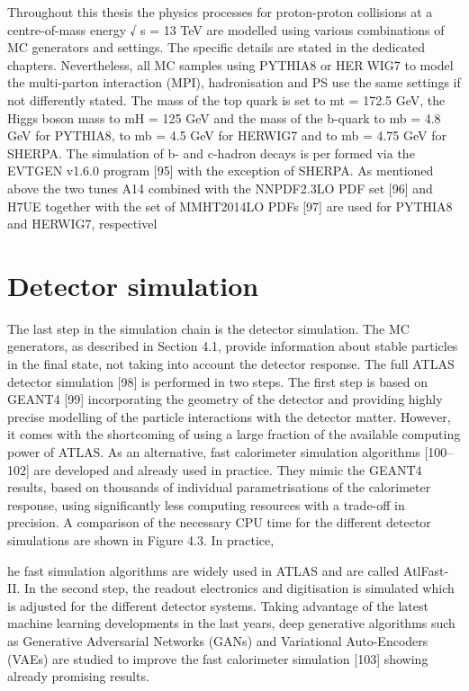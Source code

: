 Throughout this thesis the physics processes for proton-proton collisions at a centre-of-mass energy
√
s = 13 TeV are modelled using various combinations of MC generators and settings. The specific
details are stated in the dedicated chapters. Nevertheless, all MC samples using PYTHIA8 or HERWIG7 to model the multi-parton interaction (MPI), hadronisation and PS use the same settings if not
differently stated. The mass of the top quark is set to mt = 172.5 GeV, the Higgs boson mass to
mH = 125 GeV and the mass of the b-quark to mb = 4.8 GeV for PYTHIA8, to mb = 4.5 GeV for
HERWIG7 and to mb = 4.75 GeV for SHERPA. The simulation of b- and c-hadron decays is performed via the EVTGEN v1.6.0 program [95] with the exception of SHERPA. As mentioned above
the two tunes A14 combined with the NNPDF2.3LO PDF set [96] and H7UE together with the set
of MMHT2014LO PDFs [97] are used for PYTHIA8 and HERWIG7, respectivel


\section{Detector simulation}

The last step in the simulation chain is the detector simulation. The MC generators, as described
in Section 4.1, provide information about stable particles in the final state, not taking into account
the detector response. The full ATLAS detector simulation [98] is performed in two steps. The
first step is based on GEANT4 [99] incorporating the geometry of the detector and providing highly
precise modelling of the particle interactions with the detector matter. However, it comes with the
shortcoming of using a large fraction of the available computing power of ATLAS. As an alternative,
fast calorimeter simulation algorithms [100–102] are developed and already used in practice. They
mimic the GEANT4 results, based on thousands of individual parametrisations of the calorimeter
response, using significantly less computing resources with a trade-off in precision. A comparison
of the necessary CPU time for the different detector simulations are shown in Figure 4.3. In practice,

he fast simulation algorithms are widely used in ATLAS and are called AtlFast-II. In the second
step, the readout electronics and digitisation is simulated which is adjusted for the different detector
systems.
Taking advantage of the latest machine learning developments in the last years, deep generative
algorithms such as Generative Adversarial Networks (GANs) and Variational Auto-Encoders (VAEs)
are studied to improve the fast calorimeter simulation [103] showing already promising results.